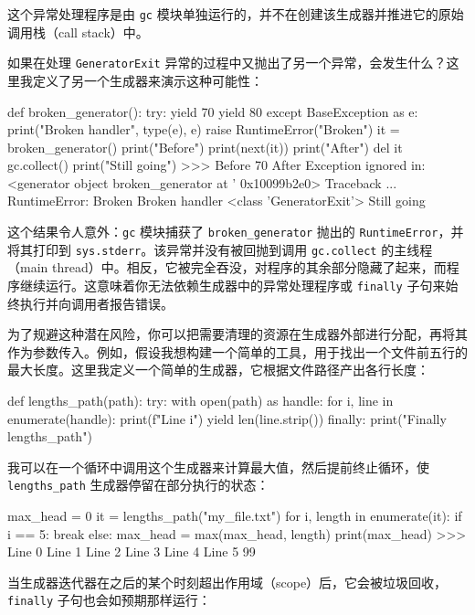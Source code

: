 这个异常处理程序是由 \texttt{gc} 模块单独运行的，并不在创建该生成器并推进它的原始调用栈（call stack）中。

如果在处理 \texttt{GeneratorExit} 异常的过程中又抛出了另一个异常，会发生什么？这里我定义了另一个生成器来演示这种可能性：

\begin{codebox}[python]
def broken_generator():
    try:
        yield 70
        yield 80
    except BaseException as e:
        print("Broken handler", type(e), e)
        raise RuntimeError("Broken")
it = broken_generator()
print("Before")
print(next(it))
print("After")
del it
gc.collect()
print("Still going")
>>>
Before
70
After
Exception ignored in: <generator object broken_generator at
' 0x10099b2e0>
Traceback ...
RuntimeError: Broken
Broken handler <class 'GeneratorExit'>
Still going
\end{codebox}

这个结果令人意外：\texttt{gc} 模块捕获了 \texttt{broken\_generator} 抛出的 \texttt{RuntimeError}，并将其打印到 \texttt{sys.stderr}。该异常并没有被回抛到调用 \texttt{gc.collect} 的主线程（main thread）中。相反，它被完全吞没，对程序的其余部分隐藏了起来，而程序继续运行。这意味着你无法依赖生成器中的异常处理程序或 \texttt{finally} 子句来始终执行并向调用者报告错误。

为了规避这种潜在风险，你可以把需要清理的资源在生成器外部进行分配，再将其作为参数传入。例如，假设我想构建一个简单的工具，用于找出一个文件前五行的最大长度。这里我定义一个简单的生成器，它根据文件路径产出各行长度：

\begin{codebox}[python]
def lengths_path(path):
    try:
        with open(path) as handle:
            for i, line in enumerate(handle):
                print(f"Line {i}")
                yield len(line.strip())
    finally:
        print("Finally lengths_path")
\end{codebox}

我可以在一个循环中调用这个生成器来计算最大值，然后提前终止循环，使 \texttt{lengths\_path} 生成器停留在部分执行的状态：

\begin{codebox}[python]
max_head = 0
it = lengths_path("my_file.txt")
for i, length in enumerate(it):
    if i == 5:
        break
    else:
        max_head = max(max_head, length)
print(max_head)
>>>
Line 0
Line 1
Line 2
Line 3
Line 4
Line 5
99
\end{codebox}

当生成器迭代器在之后的某个时刻超出作用域（scope）后，它会被垃圾回收，\texttt{finally} 子句也会如预期那样运行：

